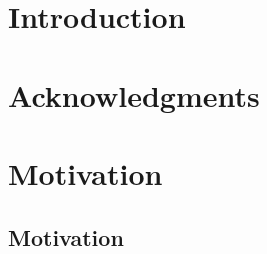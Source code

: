 \documentclass[11pt,a4paper]{book}
\begin{document}
\nocite{*}

\frontmatter


%

\chapter*{Introduction}


\chapter{Acknowledgments}



\tableofcontents

\mainmatter
\chapter{Motivation}
\label{s:Motivation}
\section{Motivation}
\label{s:motivation}



\end{document}
